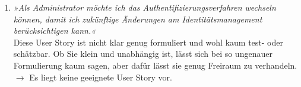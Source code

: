 \documentclass[main.tex]{subfiles}
\begin{document}
\begin{enumerate}
    \item \textit{»Als Administrator möchte ich das Authentifizierungsverfahren wechseln können, damit ich zukünftige Änderungen am Identitätsmanagement berücksichtigen kann.«}\\
    Diese User Story ist nicht klar genug formuliert und wohl kaum test- oder schätzbar. Ob Sie klein und unabhängig ist, lässt sich bei so ungenauer Formulierung kaum sagen, aber dafür lässt sie genug Freiraum zu verhandeln. \\
    $\rightarrow$ Es liegt keine geeignete User Story vor.
\end{enumerate}
\pagebreak
\end{document}
